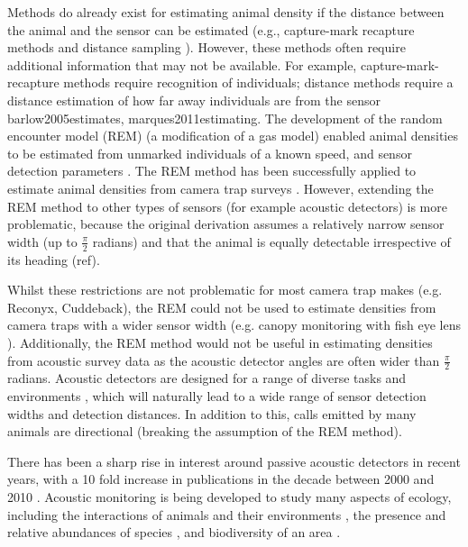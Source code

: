 \documentclass[a4paper,10pt,reqno,oneside]{amsart}
\begin{document}
Methods do already exist for estimating animal density if the distance between the animal and the sensor can be estimated (e.g., capture-mark recapture methods \citep{karanth1995estimating} and distance sampling \citep{harris2013applying}). However, these methods often require additional information that may not be available. For example, capture-mark-recapture methods \citep{karanth1995estimating, trolle2003estimation, soisalo2006estimating, trolle2007camera} require recognition of individuals; distance methods require a distance estimation of how far away individuals are from the sensor {barlow2005estimates, marques2011estimating}. The development of the random encounter model (REM) (a modification of a gas model) enabled animal densities to be estimated from unmarked individuals of a known speed, and sensor detection parameters \citep{rowcliffe2008estimating}. The REM method has been successfully applied to estimate animal densities from camera trap surveys \citep{manzo2012estimation, zero2013monitoring}. However, extending the REM method to other types of sensors (for example acoustic detectors) is more problematic, because the original derivation assumes a relatively narrow sensor width (up to $\frac{\pi}{2}$ radians) and that the animal is equally detectable irrespective of its heading (ref). %

Whilst these restrictions are not problematic for most camera trap makes (e.g. Reconyx, Cuddeback), the REM could not be used to estimate densities from camera traps with a wider sensor width (e.g. canopy monitoring with fish eye lens \citep{brusa2014increasing}). Additionally, the REM method would not be useful in estimating densities from acoustic survey data as the acoustic detector angles are often wider than $\frac{\pi}{2}$ radians.  Acoustic detectors are designed for a range of diverse tasks and environments \citep{kessel2014review}, which will naturally lead to a wide range of sensor detection widths and detection distances. In addition to this, calls emitted by many animals are directional (breaking the assumption of the REM method). 

There has been a sharp rise in interest around passive acoustic detectors in recent years, with a 10 fold increase in publications in the decade between 2000 and 2010 \citep{kessel2014review}. Acoustic monitoring is being developed to study many aspects of ecology, including the interactions of animals and their environments \citep{blumstein2011acoustic, rogers2013density}, the presence and relative abundances of species \citep{marcoux2011local}, and biodiversity of an area \citep{depraetere2012monitoring}. 
\end{document}
